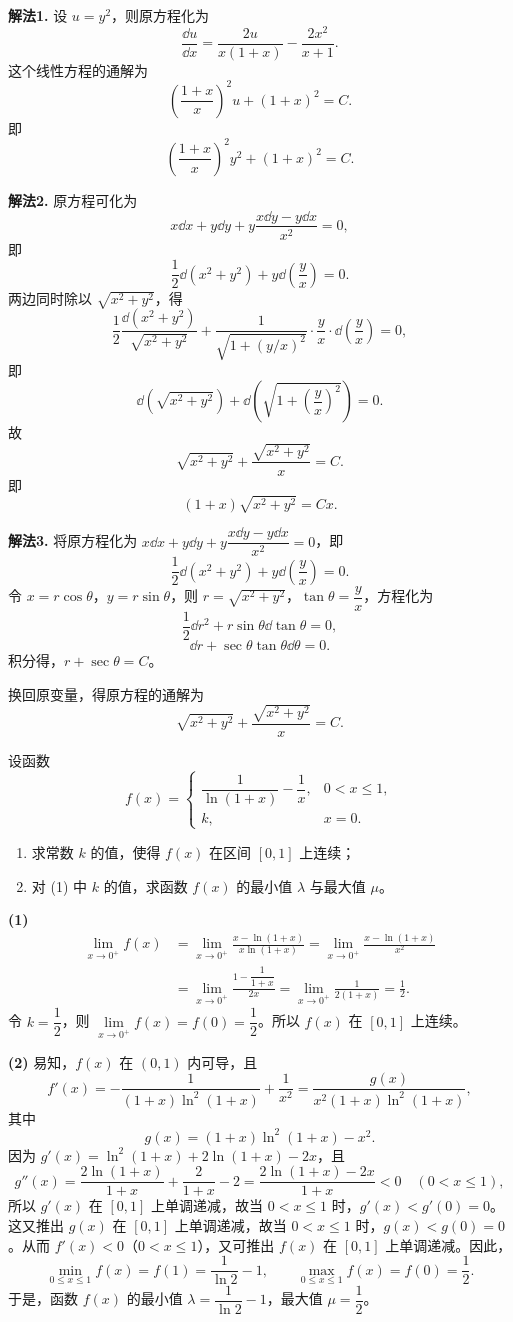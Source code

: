 \begin{solution}
\textbf{解法1.} 设 $u=y^2$，则原方程化为
\[ \frac{\dd u}{\dd x}=\frac{2u}{x(1+x)}-\frac{2x^2}{x+1}. \]
这个线性方程的通解为
\[ \left(\frac{1+x}{x}\right)^2u+(1+x)^2=C. \]
即
\[ \left(\frac{1+x}{x}\right)^2y^2+(1+x)^2=C. \]

\textbf{解法2.} 原方程可化为
\[ x\dd x+y\dd y+y\frac{x\dd y-y\dd x}{x^2}=0, \]
即
\[ \frac{1}{2}\dd(x^2+y^2)+y\dd\left(\frac{y}{x}\right)=0. \]
两边同时除以 $\sqrt{x^2+y^2}$，得
\[ \frac{1}{2}\frac{\dd(x^2+y^2)}{\sqrt{x^2+y^2}}+\frac{1}{\sqrt{1+(y/x)^2}}\cdot\frac{y}{x}\cdot\dd\left(\frac{y}{x}\right)=0, \]
即
\[ \dd\left(\sqrt{x^2+y^2}\right)+\dd\left(\sqrt{1+\left(\frac{y}{x}\right)^2}\right)=0. \]
故
\[ \sqrt{x^2+y^2}+\frac{\sqrt{x^2+y^2}}{x}=C. \]
即
\[ (1+x)\sqrt{x^2+y^2}=Cx. \]

\textbf{解法3.} 将原方程化为 $x\dd x+y\dd y+y\dfrac{x\dd y-y\dd x}{x^2}=0$，即
\[ \frac{1}{2}\dd(x^2+y^2)+y\dd\left(\frac{y}{x}\right)=0. \]
令 $x=r\cos\theta$，$y=r\sin\theta$，则 $r=\sqrt{x^2+y^2}$，$\tan\theta=\dfrac{y}{x}$，方程化为
\[ \frac{1}{2}\dd r^2+r\sin\theta\dd\tan\theta=0, \]
\[ \dd r+\sec\theta\tan\theta\dd\theta=0. \]
积分得，$r+\sec\theta=C$。

换回原变量，得原方程的通解为
\[ \sqrt{x^2+y^2}+\frac{\sqrt{x^2+y^2}}{x}=C. \]
\end{solution}

设函数
\[ f(x)=\begin{cases}\dfrac{1}{\ln(1+x)}-\dfrac{1}{x}, & 0<x\le1,\\[6pt] k, & x=0. \end{cases} \]
\begin{enumerate}
  \item 求常数 $k$ 的值，使得 $f(x)$ 在区间 $[0,1]$ 上连续；
  \item 对 (1) 中 $k$ 的值，求函数 $f(x)$ 的最小值 $\lambda$ 与最大值 $\mu$。
\end{enumerate}
\begin{solution}
\textbf{(1)}
\begin{align*}
\lim_{x\to0^+}f(x) &= \lim_{x\to0^+}\frac{x-\ln(1+x)}{x\ln(1+x)}=\lim_{x\to0^+}\frac{x-\ln(1+x)}{x^2}\\
&= \lim_{x\to0^+}\frac{1-\dfrac{1}{1+x}}{2x}=\lim_{x\to0^+}\frac{1}{2(1+x)}=\frac{1}{2}.
\end{align*}
令 $k=\dfrac{1}{2}$，则 $\lim\limits_{x\to0^+}f(x)=f(0)=\dfrac{1}{2}$。所以 $f(x)$ 在 $[0,1]$ 上连续。

\textbf{(2)} 易知，$f(x)$ 在 $(0,1)$ 内可导，且
\[ f'(x)=-\frac{1}{(1+x)\ln^2(1+x)}+\frac{1}{x^2}=\frac{g(x)}{x^2(1+x)\ln^2(1+x)}, \]
其中
\[ g(x)=(1+x)\ln^2(1+x)-x^2. \]
因为 $g'(x)=\ln^2(1+x)+2\ln(1+x)-2x$，且
\[ g''(x)=\frac{2\ln(1+x)}{1+x}+\frac{2}{1+x}-2=\frac{2\ln(1+x)-2x}{1+x}<0\quad(0<x\le1), \]
所以 $g'(x)$ 在 $[0,1]$ 上单调递减，故当 $0<x\le1$ 时，$g'(x)<g'(0)=0$。这又推出 $g(x)$ 在 $[0,1]$ 上单调递减，故当 $0<x\le1$ 时，$g(x)<g(0)=0$。从而 $f'(x)<0$（$0<x\le1$），又可推出 $f(x)$ 在 $[0,1]$ 上单调递减。因此，
\[ \min_{0\le x\le1}f(x)=f(1)=\frac{1}{\ln2}-1,\qquad \max_{0\le x\le1}f(x)=f(0)=\frac{1}{2}. \]
于是，函数 $f(x)$ 的最小值 $\lambda=\dfrac{1}{\ln2}-1$，最大值 $\mu=\dfrac{1}{2}$。
\end{solution}

